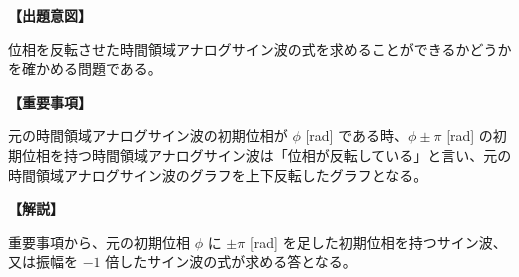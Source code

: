 \noindent \textbf{【出題意図】}

\noindent 位相を反転させた時間領域アナログサイン波の式を求めることができるかどうかを確かめる問題である。

\vspace{1em}
\noindent \textbf{【重要事項】}

\bigskip
元の時間領域アナログサイン波の初期位相が $\phi$ [rad] である時、$\phi \pm \pi$ [rad] の初期位相を持つ時間領域アナログサイン波は「位相が反転している」と言い、元の時間領域アナログサイン波のグラフを上下反転したグラフとなる。

\vspace{1em}
\noindent \textbf{【解説】}

\noindent 重要事項から、元の初期位相 $\phi$ に $\pm \pi$ [rad] を足した初期位相を持つサイン波、又は振幅を $-1$ 倍したサイン波の式が求める答となる。
